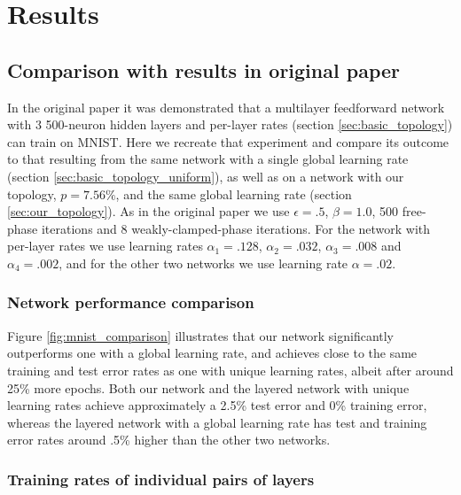 \documentclass[utf8]{frontiersSCNS}
\begin{document}
\section{Results}

\subsection{Comparison with results in original paper}
\label{sec:origpaper}

In the original paper \citep{scellier17} it was demonstrated that a multilayer feedforward network with 3 500-neuron hidden layers and per-layer rates (section \ref{sec:basic_topology}) can train on MNIST. Here we recreate that experiment and compare its outcome to that resulting from the same network with a single global learning rate (section \ref{sec:basic_topology_uniform}), as well as on a network with our topology, $p=7.56\%$, and the same global learning rate (section \ref{sec:our_topology}). As in the original paper we use $\epsilon=.5$, $\beta=1.0$, 500 free-phase iterations and 8 weakly-clamped-phase iterations. For the network with per-layer rates we use learning rates $\alpha_1=.128$, $\alpha_2=.032$, $\alpha_3=.008$ and $\alpha_4=.002$, and for the other two networks we use learning rate $\alpha=.02$.

\subsubsection{Network performance comparison}
\label{sec:network_performance}

Figure \ref{fig:mnist_comparison} illustrates that our network significantly outperforms one with a global learning rate, and achieves close to the same training and test error rates as one with unique learning rates, albeit after around 25\% more epochs. Both our network and the layered network with unique learning rates achieve approximately a 2.5\% test error and 0\% training error, whereas the layered network with a global learning rate has test and training error rates around .5\% higher than the other two networks.

\subsubsection{Training rates of individual pairs of layers}
\label{sec:mnist_perlayer}
\end{document}
